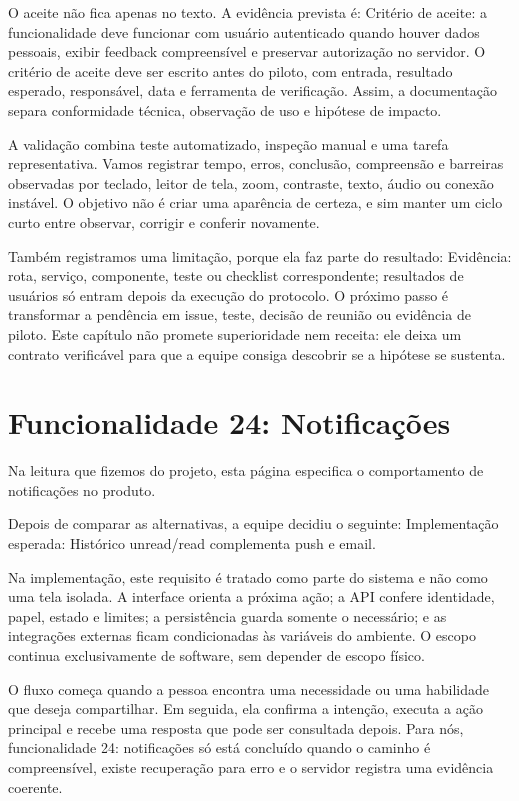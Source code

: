 \documentclass[12pt,oneside,a4paper,article]{abntex2}
\begin{document}
O aceite não fica apenas no texto. A evidência prevista é: Critério de aceite: a funcionalidade deve funcionar com usuário autenticado quando houver dados pessoais, exibir feedback compreensível e preservar autorização no servidor. O critério de aceite deve ser escrito antes do piloto, com entrada, resultado esperado, responsável, data e ferramenta de verificação. Assim, a documentação separa conformidade técnica, observação de uso e hipótese de impacto.

A validação combina teste automatizado, inspeção manual e uma tarefa representativa. Vamos registrar tempo, erros, conclusão, compreensão e barreiras observadas por teclado, leitor de tela, zoom, contraste, texto, áudio ou conexão instável. O objetivo não é criar uma aparência de certeza, e sim manter um ciclo curto entre observar, corrigir e conferir novamente.

Também registramos uma limitação, porque ela faz parte do resultado: Evidência: rota, serviço, componente, teste ou checklist correspondente; resultados de usuários só entram depois da execução do protocolo. O próximo passo é transformar a pendência em issue, teste, decisão de reunião ou evidência de piloto. Este capítulo não promete superioridade nem receita: ele deixa um contrato verificável para que a equipe consiga descobrir se a hipótese se sustenta.

\section{Funcionalidade 24: Notificações}
Na leitura que fizemos do projeto, esta página especifica o comportamento de notificações no produto.

Depois de comparar as alternativas, a equipe decidiu o seguinte: Implementação esperada: Histórico unread/read complementa push e email.

Na implementação, este requisito é tratado como parte do sistema e não como uma tela isolada. A interface orienta a próxima ação; a API confere identidade, papel, estado e limites; a persistência guarda somente o necessário; e as integrações externas ficam condicionadas às variáveis do ambiente. O escopo continua exclusivamente de software, sem depender de escopo físico.

O fluxo começa quando a pessoa encontra uma necessidade ou uma habilidade que deseja compartilhar. Em seguida, ela confirma a intenção, executa a ação principal e recebe uma resposta que pode ser consultada depois. Para nós, funcionalidade 24: notificações só está concluído quando o caminho é compreensível, existe recuperação para erro e o servidor registra uma evidência coerente.
\end{document}
